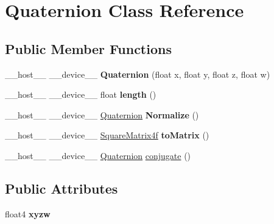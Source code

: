 \hypertarget{class_quaternion}{}\section{Quaternion Class Reference}
\label{class_quaternion}
\subsection*{Public Member Functions}
\begin{DoxyCompactItemize}
\item 
\+\_\+\+\_\+host\+\_\+\+\_\+ \+\_\+\+\_\+device\+\_\+\+\_\+ {\bfseries Quaternion} (float x, float y, float z, float w)\hypertarget{class_quaternion_a1a4bd86f9d61fd86784c4c0242706f71}{}\label{class_quaternion_a1a4bd86f9d61fd86784c4c0242706f71}

\item 
\+\_\+\+\_\+host\+\_\+\+\_\+ \+\_\+\+\_\+device\+\_\+\+\_\+ float {\bfseries length} ()\hypertarget{class_quaternion_a78a3e8c21812d2311790df5152e3c139}{}\label{class_quaternion_a78a3e8c21812d2311790df5152e3c139}

\item 
\+\_\+\+\_\+host\+\_\+\+\_\+ \+\_\+\+\_\+device\+\_\+\+\_\+ \hyperlink{class_quaternion}{Quaternion} {\bfseries Normalize} ()\hypertarget{class_quaternion_a90a71b875a7bc6e705e829805e748184}{}\label{class_quaternion_a90a71b875a7bc6e705e829805e748184}

\item 
\+\_\+\+\_\+host\+\_\+\+\_\+ \+\_\+\+\_\+device\+\_\+\+\_\+ \hyperlink{class_square_matrix4}{Square\+Matrix4f} {\bfseries to\+Matrix} ()\hypertarget{class_quaternion_a5474d0118b84350ddbd163bdd7ff1e60}{}\label{class_quaternion_a5474d0118b84350ddbd163bdd7ff1e60}

\item 
\+\_\+\+\_\+host\+\_\+\+\_\+ \+\_\+\+\_\+device\+\_\+\+\_\+ \hyperlink{class_quaternion}{Quaternion} \hyperlink{class_quaternion_aee895e4a7d8f3d0e8a65d9ddea5b24b5}{conjugate} ()
\end{DoxyCompactItemize}
\subsection*{Public Attributes}
\begin{DoxyCompactItemize}
\item 
float4 {\bfseries xyzw}\hypertarget{class_quaternion_aaa1be23ee999c4dd0a7c670db2dbf10c}{}\label{class_quaternion_aaa1be23ee999c4dd0a7c670db2dbf10c}

\end{DoxyCompactItemize}


